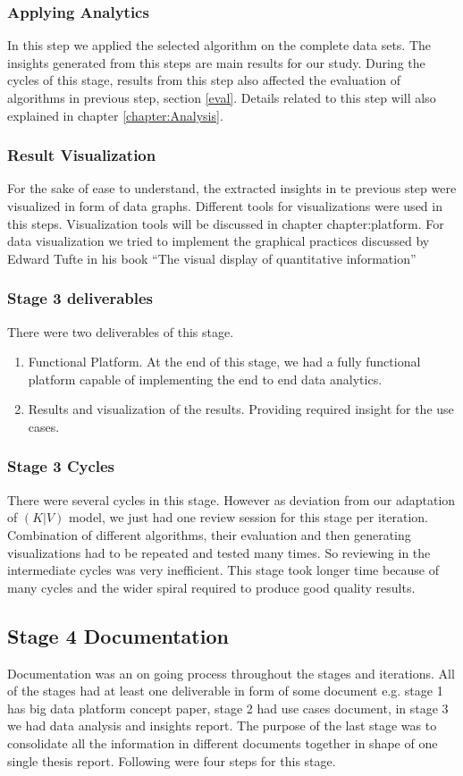 \subsubsection{Applying Analytics}
In this step we applied the selected algorithm on the complete data sets. The insights generated from this steps are main results for our study. During the cycles of this stage, results from this step also affected the evaluation of algorithms in previous step, section \ref{eval}. Details related to this step will also explained in chapter \ref{chapter:Analysis}.    
\subsubsection{Result Visualization}
For the sake of ease to understand, the extracted insights in te previous step were visualized in form of data graphs. Different tools for visualizations were used in this steps. Visualization tools will be discussed in chapter {chapter:platform}. For data visualization we tried to implement the graphical practices discussed by Edward Tufte in his book ``The visual display of quantitative information''\cite{tufte1983visual}
\subsubsection{Stage 3 deliverables}
There were two deliverables of this stage.
\begin{enumerate}
\item Functional Platform. At the end of this stage, we had a fully functional platform capable of implementing the end to end data analytics.
\item Results and visualization of the results. Providing required insight for the use cases. 
\end{enumerate}
\subsubsection{Stage 3 Cycles}
There were several cycles in this stage. However as deviation from our adaptation of \((K|V)\) model, we just had one review session for this stage per iteration. Combination of different algorithms, their evaluation and then generating visualizations had to be repeated and tested many times. So reviewing in the intermediate cycles was very inefficient. This stage took longer time because of many cycles and the wider spiral required to produce good quality results.
\subsection{Stage 4 Documentation}
Documentation was an on going process throughout the stages and iterations. All of the stages had at least one deliverable in form of some document e.g. stage 1 has big data platform concept paper, stage 2 had use cases document, in stage 3 we had data analysis and insights report. The purpose of the last stage was to consolidate all the information in different documents together in shape of one single thesis report. Following were four steps for this stage. 
